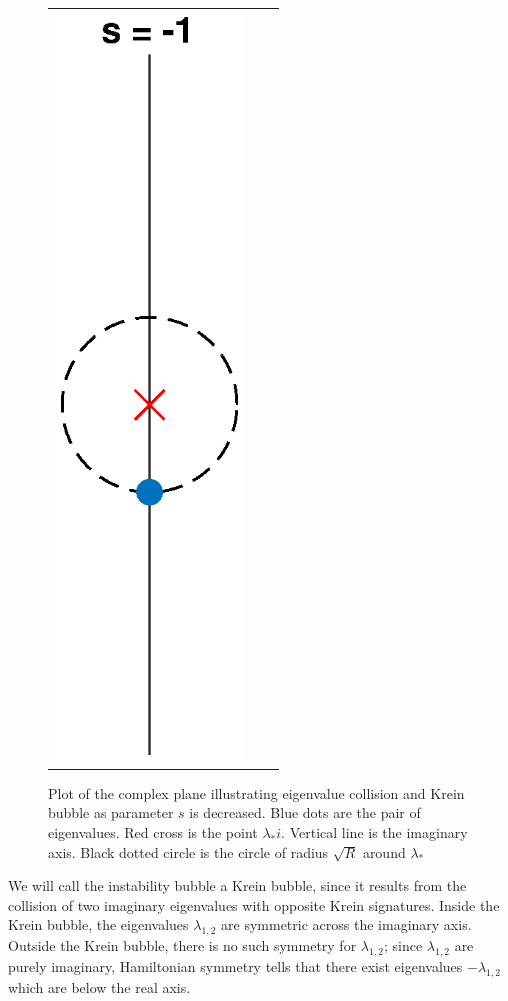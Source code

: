 \documentclass[thesis.tex]{subfiles}
\begin{document}
\begin{figure}[H]
\begin{center}
\begin{tabular}{ccc}
\includegraphics[width=5cm]{images/kreinbubbles/bubbleminusR}
\end{tabular}
\caption{Plot of the complex plane illustrating eigenvalue collision and Krein bubble as parameter $s$ is decreased. Blue dots are the pair of eigenvalues. Red cross is the point $\lambda_* i$. Vertical line is the imaginary axis. Black dotted circle is the circle of radius $\sqrt{R}$ around $\lambda_*$ }
\label{fig:kreinbubbles}
\end{center}
\end{figure}
We will call the instability bubble a Krein bubble, since it results from the collision of two imaginary eigenvalues with opposite Krein signatures. Inside the Krein bubble, the eigenvalues $\lambda_{1,2}$ are symmetric across the imaginary axis. Outside the Krein bubble, there is no such symmetry for $\lambda_{1,2}$; since $\lambda_{1,2}$ are purely imaginary, Hamiltonian symmetry tells that there exist eigenvalues $-\lambda_{1,2}$ which are below the real axis.
\end{document}
